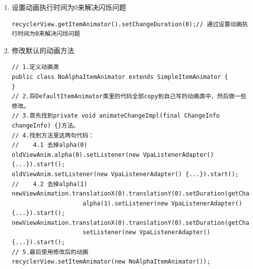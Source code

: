 \documentclass[9pt, b5paper]{article}
\begin{document}
\begin{enumerate}
\begin{enumerate}
\begin{verbatim}
     * The value of this property is true by default.
     *
     */
    public void setSupportsChangeAnimations(boolean supportsChangeAnimations) {
        mSupportsChangeAnimations = supportsChangeAnimations;
    }
\end{verbatim}
\begin{itemize}
\item 只要设置为false，就可以不显示动画了，也就解决了闪烁问题。 关键代码：
\end{itemize}
\begin{verbatim}
((SimpleItemAnimator)recyclerView.getItemAnimator()).setSupportsChangeAnimations(false);
\end{verbatim}
\item 设置动画执行时间为0来解决闪烁问题
\label{sec-5-3-5-1-3}
\begin{verbatim}
recyclerView.getItemAnimator().setChangeDuration(0);// 通过设置动画执行时间为0来解决闪烁问题
\end{verbatim}
\item 修改默认的动画方法
\label{sec-5-3-5-1-4}
\begin{verbatim}
// 1.定义动画类
public class NoAlphaItemAnimator extends SimpleItemAnimator {
}
// 2.将DefaultItemAnimator类里的代码全部copy到自己写的动画类中，然后做一些修改。
// 3.首先找到private void animateChangeImpl(final ChangeInfo changeInfo) {}方法。
// 4.找到方法里这两句代码：
//    4.1 去掉alpha(0)
oldViewAnim.alpha(0).setListener(new VpaListenerAdapter() {...}).start();
oldViewAnim.setListener(new VpaListenerAdapter() {...}).start();
//    4.2 去掉alpha(1)
newViewAnimation.translationX(0).translationY(0).setDuration(getChangeDuration()).
                    alpha(1).setListener(new VpaListenerAdapter() {...}).start();
newViewAnimation.translationX(0).translationY(0).setDuration(getChangeDuration()).
                    setListener(new VpaListenerAdapter() {...}).start();
// 5.最后使用修改后的动画
recyclerView.setItemAnimator(new NoAlphaItemAnimator());
\end{verbatim}
\end{enumerate}
\end{enumerate}
\end{document}
